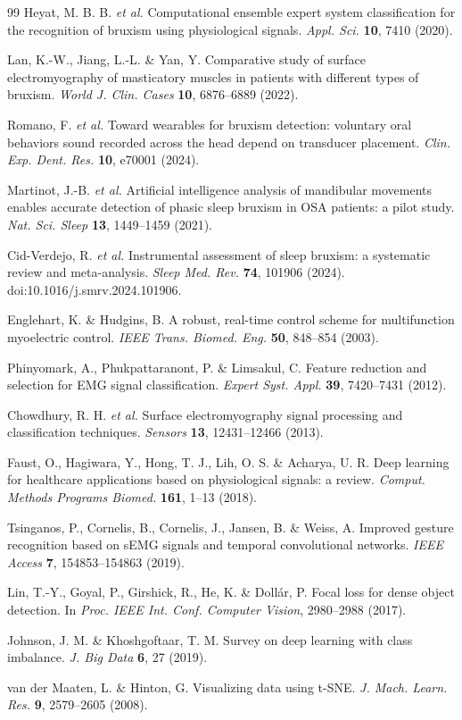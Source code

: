 \documentclass[pdflatex,sn-nature,iicol]{sn-jnl}
\begin{document}
\begin{thebibliography}{99}
Heyat, M. B. B. \emph{et al.} Computational ensemble expert system classification for the recognition of bruxism using physiological signals. \emph{Appl. Sci.} \textbf{10}, 7410 (2020).

Lan, K.-W., Jiang, L.-L. \& Yan, Y. Comparative study of surface electromyography of masticatory muscles in patients with different types of bruxism. \emph{World J. Clin. Cases} \textbf{10}, 6876--6889 (2022).

Romano, F. \emph{et al.} Toward wearables for bruxism detection: voluntary oral behaviors sound recorded across the head depend on transducer placement. \emph{Clin. Exp. Dent. Res.} \textbf{10}, e70001 (2024).

Martinot, J.-B. \emph{et al.} Artificial intelligence analysis of mandibular movements enables accurate detection of phasic sleep bruxism in OSA patients: a pilot study. \emph{Nat. Sci. Sleep} \textbf{13}, 1449--1459 (2021).

Cid-Verdejo, R. \emph{et al.} Instrumental assessment of sleep bruxism: a systematic review and meta-analysis. \emph{Sleep Med. Rev.} \textbf{74}, 101906 (2024). doi:10.1016/j.smrv.2024.101906.

Englehart, K. \& Hudgins, B. A robust, real-time control scheme for multifunction myoelectric control. \emph{IEEE Trans. Biomed. Eng.} \textbf{50}, 848--854 (2003).

Phinyomark, A., Phukpattaranont, P. \& Limsakul, C. Feature reduction and selection for EMG signal classification. \emph{Expert Syst. Appl.} \textbf{39}, 7420--7431 (2012).

Chowdhury, R. H. \emph{et al.} Surface electromyography signal processing and classification techniques. \emph{Sensors} \textbf{13}, 12431--12466 (2013).

Faust, O., Hagiwara, Y., Hong, T. J., Lih, O. S. \& Acharya, U. R. Deep learning for healthcare applications based on physiological signals: a review. \emph{Comput. Methods Programs Biomed.} \textbf{161}, 1--13 (2018).

Tsinganos, P., Cornelis, B., Cornelis, J., Jansen, B. \& Weiss, A. Improved gesture recognition based on sEMG signals and temporal convolutional networks. \emph{IEEE Access} \textbf{7}, 154853--154863 (2019).

Lin, T.-Y., Goyal, P., Girshick, R., He, K. \& Doll\'ar, P. Focal loss for dense object detection. In \emph{Proc. IEEE Int. Conf. Computer Vision}, 2980--2988 (2017).

Johnson, J. M. \& Khoshgoftaar, T. M. Survey on deep learning with class imbalance. \emph{J. Big Data} \textbf{6}, 27 (2019).

van der Maaten, L. \& Hinton, G. Visualizing data using t-SNE. \emph{J. Mach. Learn. Res.} \textbf{9}, 2579--2605 (2008).

\end{thebibliography}
\end{document}
